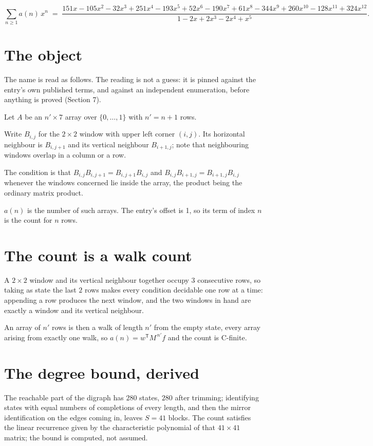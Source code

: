 \documentclass[11pt]{article}
\theoremstyle{definition}
\begin{document}
\[\sum_{n \ge 1} a(n)\,x^n \;=\; \frac{151x - 105x^{2} - 32x^{3} + 251x^{4} - 193x^{5} + 52x^{6} - 190x^{7} + 61x^{8} - 344x^{9} + 260x^{10} - 128x^{11} + 324x^{12}}{1 - 2x + 2x^{3} - 2x^{4} + x^{5}}.\]

\section{The object}

The name is read as follows. The reading is not a guess: it is pinned against the entry's own published terms, and against an independent enumeration, before anything is proved (Section 7).

Let $A$ be an $n' \times 7$ array over $\{0,\dots,1\}$ with $n' = n + 1$ rows.

Write $B_{i,j}$ for the $2\times2$ window with upper left corner $(i,j)$. Its horizontal neighbour is $B_{i,j+1}$ and its vertical neighbour $B_{i+1,j}$; note that neighbouring windows overlap in a column or a row.

The condition is that $B_{i,j}B_{i,j+1} = B_{i,j+1}B_{i,j}$ and $B_{i,j}B_{i+1,j} = B_{i+1,j}B_{i,j}$ whenever the windows concerned lie inside the array, the product being the ordinary matrix product.

$a(n)$ is the number of such arrays. The entry's offset is 1, so its term of index $n$ is the count for $n$ rows.

\section{The count is a walk count}

A $2\times2$ window and its vertical neighbour together occupy $3$ consecutive rows, so taking as state the last $2$ rows makes every condition decidable one row at a time: appending a row produces the next window, and the two windows in hand are exactly a window and its vertical neighbour.

An array of $n'$ rows is then a walk of length $n'$ from the empty state, every array arising from exactly one walk, so $a(n) = w^{\mathsf T}M^{\,n'}f$ and the count is C-finite.

\section{The degree bound, derived}

The reachable part of the digraph has $280$ states, $280$ after trimming; identifying states with equal numbers of completions of every length, and then the mirror identification on the edges coming in, leaves $S = 41$ blocks. The count satisfies the linear recurrence given by the characteristic polynomial of that $41\times41$ matrix; the bound is computed, not assumed.
\end{document}
